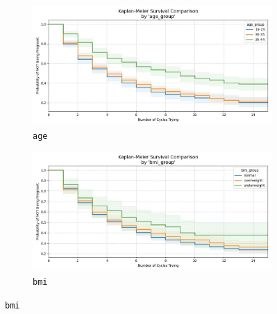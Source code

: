 \documentclass[11pt]{article}
\begin{document}
\begin{figure}[h]
  \centering
  \begin{subfigure}{0.45\textwidth}
    \includegraphics[width=\linewidth]{plots/survival_comparison_age_group.jpg}
    \caption{\texttt{age}}
  \end{subfigure}
  \hfill
  \begin{subfigure}{0.45\textwidth}
    \includegraphics[width=\linewidth]{plots/survival_comparison_bmi_group.jpg}
    \caption{\texttt{bmi}}
  \end{subfigure}

  \vspace{0.3cm}


\end{figure}
\end{document}

